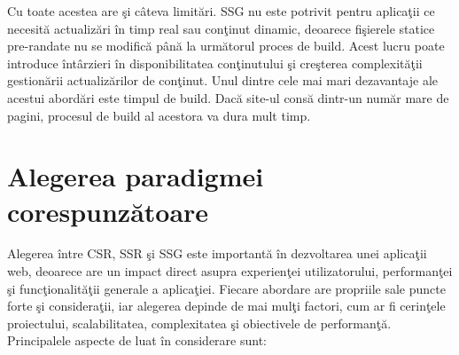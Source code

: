 \documentclass[12pt, a4paper]{report}
\begin{document}
Cu toate acestea are \c si c\^ateva limit\u ari. SSG nu este potrivit pentru aplica\c tii ce necesit\u a actualiz\u ari \^in timp real sau con\c tinut dinamic, deoarece fi\c sierele statice pre-randate nu se modific\u a p\^an\u a la urm\u atorul proces de build. Acest lucru poate introduce \^int\^arzieri \^in disponibilitatea con\c tinutului \c si cre\c sterea complexit\u a\c tii gestion\u arii actualiz\u arilor de con\c tinut. \cite{rendering-patterns}
Unul dintre cele mai mari dezavantaje ale acestui abord\u ari este timpul de build. Dac\u a site-ul cons\u a dintr-un num\u ar mare de pagini, procesul de build al acestora va dura mult timp.


\section{Alegerea paradigmei corespunz\u atoare}

Alegerea \^intre CSR, SSR \c si SSG este important\u a \^in dezvoltarea unei aplica\c tii web, deoarece are un impact direct asupra experien\c tei utilizatorului, performan\c tei \c si func\c tionalit\u a\c tii generale a aplica\c tiei. Fiecare abordare are propriile sale puncte forte \c si considera\c tii, iar alegerea depinde de mai mul\c ti factori, cum ar fi cerin\c tele proiectului, scalabilitatea, complexitatea \c si obiectivele de performan\c t\u a. Principalele aspecte de luat \^in considerare sunt:\cite{choose-rendering}
\end{document}
